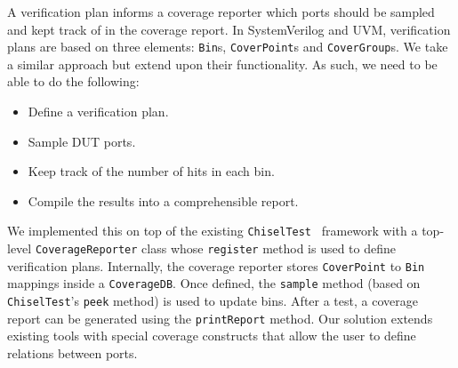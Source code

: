 \documentclass[conference]{IEEEtran}
\begin{document}
A verification plan informs a coverage reporter which ports should be sampled and kept track of in the coverage report. In SystemVerilog and UVM, verification plans are based on three elements: \texttt{Bin}s, \texttt{CoverPoint}s and \texttt{CoverGroup}s. We take a similar approach but extend upon their functionality. As such, we need to be able to do the following: %
\begin{itemize}
\item Define a verification plan. %
\item Sample DUT ports.%
\item Keep track of the number of hits in each bin.%
\item Compile the results into a comprehensible report.%
\end{itemize}

We implemented this on top of the existing \texttt{ChiselTest}~\cite{chisel:tester2} framework with a top-level \texttt{CoverageReporter} class whose \texttt{register} method is used to define verification plans. Internally, the coverage reporter stores \texttt{CoverPoint} to \texttt{Bin} mappings inside a \texttt{CoverageDB}. Once defined, the \texttt{sample} method (based on \texttt{ChiselTest}'s \texttt{peek} method) is used to update bins. After a test, a coverage report can be generated using the \texttt{printReport} method. Our solution extends existing tools with special coverage constructs that allow the user to define relations between ports. %
\end{document}
